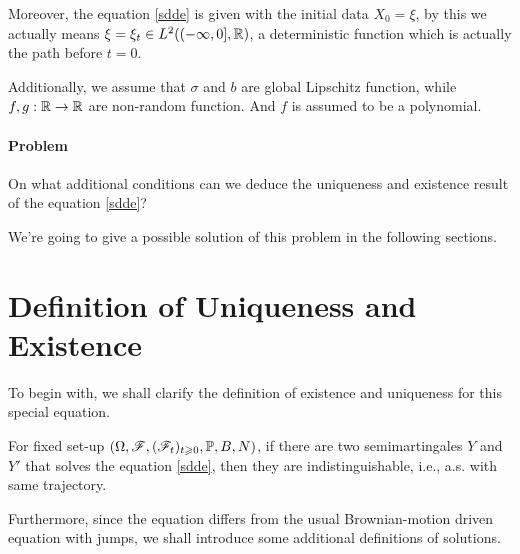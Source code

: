 \documentclass[8pt,onesided]{article}
\begin{document}
Moreover, the equation \ref{sdde} is given with the initial data $X_0=\xi$, by this we actually means $\xi=\xi_t \in L^2((-\infty,0], \mathbb{R})$, a deterministic function which is actually the path before $t=0$. 

Additionally, we assume that $\sigma$ and $b$ are global Lipschitz function, while $f,g:\mathbb{R} \to \mathbb{R}$ are non-random function. And $f$ is assumed to be a polynomial.

\paragraph{Problem} On what additional conditions can we deduce the uniqueness and existence result of the equation \ref{sdde}?

We're going to give a possible solution of this problem in the following sections. 

\section{Definition of Uniqueness and Existence}
\label{ss2}

To begin with, we shall clarify the definition of existence and uniqueness for this special equation.

\begin{definition}
 For fixed set-up $(\Omega,\mathscr{F}, (\mathscr{F}_t )_{t\geqslant 0},\mathbb{P},B,N)$, if there are two semimartingales $Y$ and $Y'$ that solves the equation \ref{sdde}, then they are indistinguishable, i.e., a.s. with same trajectory.
\end{definition}

Furthermore, since the equation differs from the usual Brownian-motion driven equation with jumps, we shall introduce some additional definitions of solutions.
\end{document}
